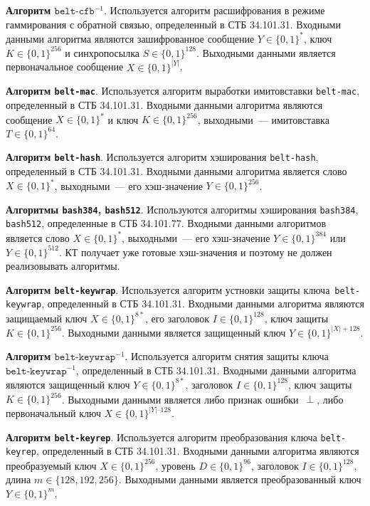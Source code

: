 {\bf Алгоритм $\texttt{belt-cfb}^{-1}$}.
Используется алгоритм расшифрования в режиме 
гаммирования с обратной связью, определенный в СТБ 34.101.31. 
Входными данными алгоритма являются зашифрованное 
сообщение $Y\in\{0,1\}^*$, ключ $K\in\{0,1\}^{256}$ 
и синхропосылка $S\in\{0,1\}^{128}$. Выходными 
данными является первоначальное сообщение $X\in\{0,1\}^{|Y|}$.

{\bf Алгоритм \texttt{belt-mac}}.
Используется алгоритм выработки имитовставки \texttt{belt-mac}, 
определенный в СТБ 34.101.31. Входными данными алгоритма 
являются сообщение $X\in\{0,1\}^*$ и ключ $K\in\{0,1\}^{256}$, 
выходными~--- имитовставка $T\in\{0,1\}^{64}$.

{\bf Алгоритм \texttt{belt-hash}}.
Используется алгоритм хэширования \texttt{belt-hash},
определенный в СТБ 34.101.31. Входными данными алгоритма 
является слово $X\in\{0,1\}^*$, выходными~--- 
его хэш-значение $Y\in\{0,1\}^{256}$.

{\bf Алгоритмы \texttt{bash384}, \texttt{bash512}}.
Используются алгоритмы хэширования \texttt{bash384}, \texttt{bash512},
определенные в СТБ 34.101.77. Входными данными алгоритмов
является слово $X\in\{0,1\}^*$, выходными~--- 
его хэш-значение $Y\in\{0,1\}^{384}$ или $Y\in\{0,1\}^{512}$.
%
КТ получает уже готовые хэш-значения и поэтому не должен реализовывать 
алгоритмы. 

{\bf Алгоритм \texttt{belt-keywrap}}.
Используется алгоритм устновки защиты ключа~\texttt{belt-keywrap}, 
определенный в СТБ 34.101.31. Входными данными алгоритма являются 
защищаемый ключ $X\in\{0,1\}^{8*}$, его заголовок $I\in\{0,1\}^{128}$, ключ 
защиты $K\in\{0,1\}^{256}$. 
Выходными данными является защищенный ключ $Y\in\{0,1\}^{|X|+128}$.

{\bf Алгоритм $\texttt{belt-keywrap}^{-1}$}.
Используется алгоритм снятия защиты ключа~$\texttt{belt-keywrap}^{-1}$, 
определенный в СТБ 34.101.31. Входными данными алгоритма являются 
защищенный ключ $Y\in\{0,1\}^{8*}$, заголовок $I\in\{0,1\}^{128}$, 
ключ защиты $K\in\{0,1\}^{256}$. Выходными данными является либо признак 
ошибки~$\perp$, либо первоначальный ключ $X\in\{0,1\}^{|Y|–128}$.

{\bf Алгоритм \texttt{belt-keyrep}}.
Используется алгоритм преобразования ключа 
\texttt{belt-keyrep}, определенный в СТБ 34.101.31.
Входными данными алгоритма являются преобразуемый ключ $X\in\{0,1\}^{256}$, 
уровень $D\in\{0,1\}^{96}$, заголовок $I\in\{0,1\}^{128}$, 
длина $m\in\{128,192,256\}$. Выходными данными 
является преобразованный ключ $Y\in\{0,1\}^{m}$.

